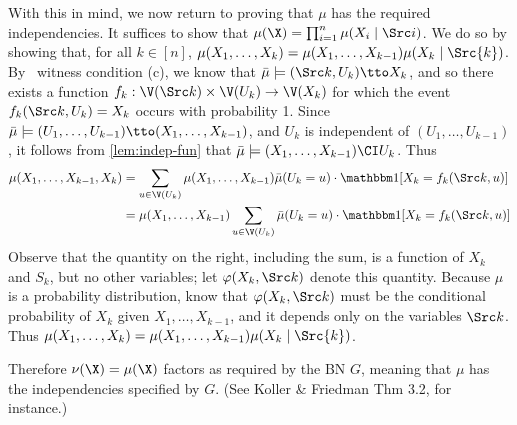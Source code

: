 \begin{subappendices}
\begin{lproof}
    With this in mind, we now return to proving that $\mu$ has the required independencies.
    It suffices to show that $\mu(\X) = \prod_{i=1}^n \mu(X_i \mid \Src i)$.
    We do so by showing that, for all $k \in [n]$, 
    $\mu(X_1, \ldots, X_{k}) = \mu(X_1, \ldots, X_{k-1}) \mu(X_{k}\mid \Src {k})$.
    By \scibility\ witness condition (c), we know that $\bar\mu\models (\Src k, U_k) \tto X_k$, and so there exists a function $f_k : \V(\Src k) \times \V(U_k) \to \V(X_k)$ for which the event $f_k(\Src k, U_k) = X_k$ occurs with probability 1. 
    Since $\bar\mu \models (U_1, \ldots, U_{k-1}) \tto (X_1, \ldots, X_{k-1})$, and $U_k$ is independent of $(U_1, \ldots, U_{k-1})$,
    it follows from \cref{lem:indep-fun} that 
    $\bar\mu \models (X_1, \ldots, X_{k-1}) \CI U_k$.
    Thus
    \begin{align*}
        \mu(X_1, \ldots, X_{k-1}, X_k)
             &= \sum_{u \in \V(U_k)}
                \mu(X_1, \ldots, X_{k-1}) \bar\mu(U_k = u) 
                    \cdot \mathbbm 1[X_k = f_k(\Src k, u)]
                    \\
            &= \mu(X_1, \ldots, X_{k-1}) \sum_{u \in \V(U_k)}\bar\mu(U_k = u) 
                \cdot \mathbbm 1[X_k = f_k(\Src k, u)]
    \end{align*}
    Observe that the quantity on the right, including the sum, is a function of $X_k$ and $S_k$, but no other variables; let  $\varphi(X_k, \Src k)$ denote this quantity. 
    Because $\mu$ is a probability distribution, know that
    $\varphi(X_k, \Src k)$ must be the conditional probability of $X_k$ given $X_1,\ldots, X_{k-1}$, and it depends only on the variables $\Src k$. Thus
    $\mu(X_1, \ldots, X_{k}) = \mu(X_1, \ldots, X_{k-1}) \mu(X_{k}\mid \Src {k})$.
    
    Therefore $\nu(\X) = \mu(\X)$ factors as required by the BN $G$, meaning that $\mu$ has the independencies specified by $G$. (See Koller \& Friedman Thm 3.2, for instance.)
    \bigskip
    

\end{lproof}
\end{subappendices}
